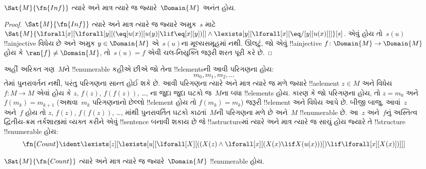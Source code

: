 \documentclass[../../../include/open-logic-section]{subfiles}
\begin{document}
\begin{prop}
$\Sat{M}{\fn{Inf}}$ ત્યારે અને માત્ર ત્યારે જ જ્યારે~$\Domain{M}$
અનંત હોય.
\end{prop}

\begin{proof}
$\Sat{M}{\fn{Inf}}$ ત્યારે અને માત્ર ત્યારે જ જ્યારે અમુક~$s$
માટે
  $\Sat{M}{\lforall[x][\lforall[y][(\eq[u(x)][u(y)] \lif \eq[x][y])]]
    \land \lexists[y][\lforall[x][\eq/[y][u(x)]]]}[s]$.
  એવું હોય તો~$s(u)$ !!a{injective} વિધેય છે અને અમુક $y
  \in \Domain{M}$ એ~$s(u)$ના મૂલ્યસમૂહમાં નથી. ઊલટું, જો એવું
  !!a{injective} $f\colon \Domain{M} \to \Domain{M}$ હોય કે
  $\ran{f} \neq \Domain{M}$, તો~$s(u) = f$ એવી ચલ-નિયુક્તિ જરૂરી
  શરત પૂરી કરે છે.
\end{proof}

અહીં અરિક્ત ગણ~$M$ને !!{enumerable} કહીએ છીએ જો તેના !!{element}sની
આવી પરિગણના હોય:
\[
m_0, m_1, m_2, \dots
\]
તેમાં પુનરાવર્તન નથી, પરંતુ પરિગણના સાન્ત હોઈ શકે છે.
આવી પરિગણના ત્યારે અને માત્ર ત્યારે જ મળે જ્યારે !!a{element}
$z \in M$ અને વિધેય $f\colon M \to M$ એવાં હોય કે $z$, $f(z)$,
$f(f(z))$, \dots, ના જુદા જુદા ઘટકો જ~$M$ના બધા !!{element}s હોય.
કારણ કે જો પરિગણના હોય, તો $z = m_0$ અને $f(m_k) = m_{k+1}$
(અથવા~$m_k$ પરિગણનાનો છેલ્લો !!{element} હોય તો
$f(m_k) = m_k$) જરૂરી !!{element} અને વિધેય આપે છે. બીજી બાજુ,
આવાં~$z$ અને~$f$ હોય તો $z$, $f(z)$, $f(f(z))$, \dots, માંથી
પુનરાવર્તિત ઘટકો કાઢતાં~$M$ની પરિગણના મળે છે અને~$M$
!!{enumerable} છે. આ~$z$ અને~$f$નું અસ્તિત્વ દ્વિતીય-ક્રમ
તર્કશાસ્ત્રમાં વ્યક્ત કરીને એવું !!{sentence} બનાવી શકાય છે જે
!!a{structure}માં ત્યારે અને માત્ર ત્યારે જ સાચું હોય જ્યારે તે
!!{structure} !!{enumerable} હોય:
\[
\fn{Count} \ident
\lexists[z][\lexists[u][\lforall[X][((X(z) \land
      \lforall[x][(X(x) \lif X(u(x)))]) \lif \lforall[x][X(x)])]]]
\]

\begin{prop}
$\Sat{M}{\fn{Count}}$ ત્યારે અને માત્ર ત્યારે જ જ્યારે~$\Domain{M}$
!!{enumerable} હોય.
\end{prop}
\end{document}
